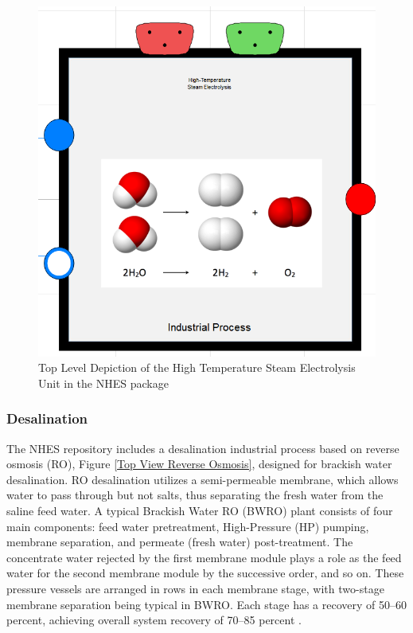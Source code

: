 \begin{figure}[hbtp]
\centering
\includegraphics[scale=0.4]{pics/HTSE.png}
\caption{Top Level Depiction of the High Temperature Steam Electrolysis Unit in the NHES package}
\label{Top View HTSE}
\end{figure}



\subsubsection{Desalination}
The NHES repository includes a desalination industrial process based on reverse osmosis (RO), Figure \ref{Top View Reverse Osmosis}, designed for brackish water desalination. RO desalination utilizes a semi-permeable membrane, which allows water to pass through but not salts, thus separating the fresh water from the saline feed water. A typical Brackish Water RO (BWRO) plant consists of four main components: feed water pretreatment, High-Pressure (HP) pumping, membrane separation, and permeate (fresh water) post-treatment. The concentrate water rejected by the first membrane module plays a role as the feed water for the second membrane module by the successive order, and so on. These pressure vessels are arranged in rows in each membrane stage, with two-stage membrane separation being typical in BWRO. Each stage has a recovery of 50–60 percent, achieving overall system recovery of 70–85 percent \cite{JongDesalination}. 

